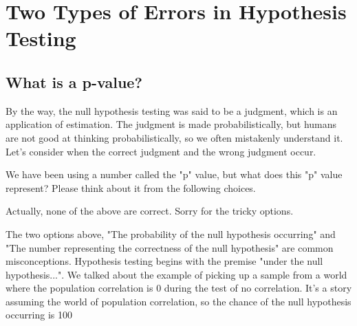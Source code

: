 \documentclass{ltjsbook}
\begin{document}
\section{Two Types of Errors in Hypothesis Testing}
\subsection{What is a p-value?}
\label{TypeI_II_Error}
By the way, the null hypothesis testing was said to be a judgment, which is an application of estimation. The judgment is made probabilistically, but humans are not good at thinking probabilistically, so we often mistakenly understand it. Let's consider when the correct judgment and the wrong judgment occur.

We have been using a number called the "p" value, but what does this "p" value represent? Please think about it from the following choices.



Actually, none of the above are correct. Sorry for the tricky options.

The two options above, "The probability of the null hypothesis occurring" and "The number representing the correctness of the null hypothesis" are common misconceptions.
Hypothesis testing begins with the premise "under the null hypothesis...". We talked about the example of picking up a sample from a world where the population correlation is 0 during the test of no correlation. It's a story assuming the world of population correlation, so the chance of the null hypothesis occurring is 100%
\end{document}
